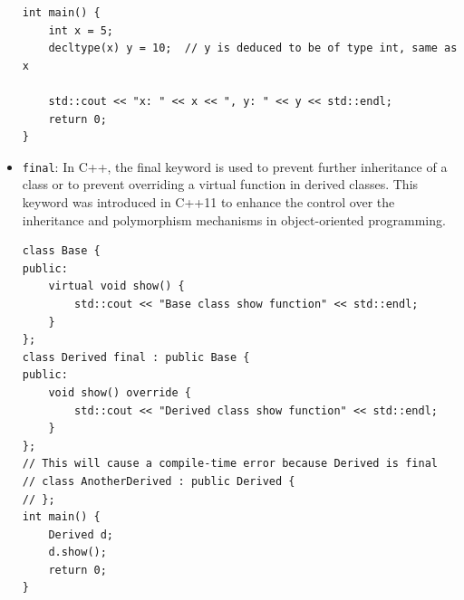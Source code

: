 \documentclass[12pt]{article}
\begin{document}
\begin{itemize}
\begin{lstlisting}
int main() {
    int x = 5;
    decltype(x) y = 10;  // y is deduced to be of type int, same as x

    std::cout << "x: " << x << ", y: " << y << std::endl;
    return 0;
}
    \end{lstlisting}
    \item \texttt{final}: In C++, the final keyword is used to prevent further inheritance of a class or to prevent overriding a virtual function in derived classes. This keyword was introduced in C++11 to enhance the control over the inheritance and polymorphism mechanisms in object-oriented programming.
    \begin{lstlisting}
class Base {
public:
    virtual void show() {
        std::cout << "Base class show function" << std::endl;
    }
};
class Derived final : public Base {
public:
    void show() override {
        std::cout << "Derived class show function" << std::endl;
    }
};
// This will cause a compile-time error because Derived is final
// class AnotherDerived : public Derived {
// };
int main() {
    Derived d;
    d.show();
    return 0;
}
    \end{lstlisting}
\end{itemize}
\end{document}
